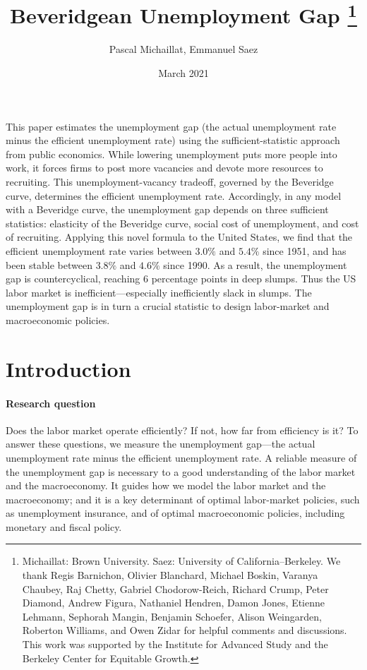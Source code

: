 \documentclass[letterpaper,12pt,leqno]{article}
\begin{document}
\author{Pascal Michaillat, Emmanuel Saez}
\title{Beveridgean Unemployment Gap
\thanks{Michaillat: Brown University. Saez: University of California--Berkeley. We thank Regis Barnichon, Olivier Blanchard, Michael Boskin, Varanya Chaubey, Raj Chetty, Gabriel Chodorow-Reich, Richard Crump, Peter Diamond, Andrew Figura, Nathaniel Hendren, Damon Jones, Etienne Lehmann, Sephorah Mangin, Benjamin Schoefer, Alison Weingarden, Roberton Williams, and Owen Zidar for helpful comments and discussions. This work was supported by the Institute for Advanced Study and the Berkeley Center for Equitable Growth.}}
\date{March 2021}

\begin{titlepage}\maketitle

This paper estimates the unemployment gap (the actual unemployment rate minus the efficient unemployment rate) using the sufficient-statistic approach from public economics. While lowering unemployment puts more people into work, it forces firms to post more vacancies and devote more resources to recruiting. This unemployment-vacancy tradeoff, governed by the Beveridge curve, determines the efficient unemployment rate. Accordingly, in any model with a Beveridge curve, the unemployment gap depends on three sufficient statistics: elasticity of the Beveridge curve, social cost of unemployment, and cost of recruiting. Applying this novel formula to the United States, we find that the efficient unemployment rate varies between $3.0\%$ and $5.4\%$ since 1951, and has been stable between $3.8\%$ and $4.6\%$ since 1990. As a result, the unemployment gap is countercyclical, reaching $6$ percentage points in deep slumps. Thus the US labor market is inefficient---especially inefficiently slack in slumps. The unemployment gap is in turn a crucial statistic to design labor-market and macroeconomic policies.

\end{titlepage}\section{Introduction}

\paragraph{Research question} Does the labor market operate efficiently? If not, how far from efficiency is it? To answer these questions, we measure the unemployment gap---the actual unemployment rate minus the efficient unemployment rate. A reliable measure of the unemployment gap is necessary to a good understanding of the labor market and the macroeconomy. It guides how we model the labor market and the macroeconomy; and it is a key determinant of optimal labor-market policies, such as unemployment insurance, and of optimal macroeconomic policies, including monetary and fiscal policy.
\end{document}
